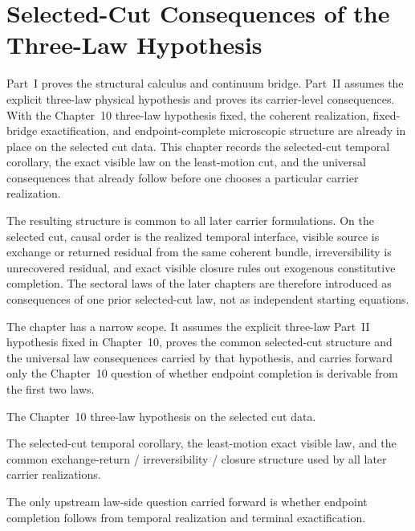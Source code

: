 \section{Selected-Cut Consequences of the Three-Law Hypothesis}
\label{sec:temporal-realization-and-unified-field}

Part~I proves the structural calculus and continuum bridge. Part~II assumes
the explicit three-law physical hypothesis and proves its carrier-level
consequences. With the Chapter~10 three-law hypothesis fixed, the coherent
realization, fixed-bridge exactification, and endpoint-complete microscopic
structure are already in place on the selected cut data. This chapter records
the selected-cut temporal corollary, the exact visible law on the least-motion
cut, and the universal consequences that already follow before one chooses a
particular carrier realization.

The resulting structure is common to all later carrier formulations. On the selected cut,
causal order is the realized temporal interface, visible source is exchange or
returned residual from the same coherent bundle, irreversibility is
unrecovered residual, and exact visible closure rules out exogenous
constitutive completion. The sectoral laws of the later chapters are therefore
introduced as consequences of one prior selected-cut law, not as independent
starting equations.

The chapter has a narrow scope. It assumes the explicit three-law Part~II
hypothesis fixed in Chapter~10, proves the common selected-cut structure and
the universal law consequences carried by that hypothesis, and carries forward only
the Chapter~10 question of whether endpoint completion is derivable from the
first two laws.

\begin{tcolorbox}[colback=white, colframe=black!75, boxrule=0.9pt, title={Chapter 11 at a glance}]
\begin{description}[leftmargin=1.7em, itemsep=0.25em]
\item[Assumes.] The Chapter~10 three-law hypothesis on the selected cut data.
\item[Proves.] The selected-cut temporal corollary, the least-motion exact
      visible law, and the common exchange-return / irreversibility / closure
      structure used by all later carrier realizations.
\item[Open.] The only upstream law-side question carried forward is whether
      endpoint completion follows from temporal realization and terminal
      exactification.
\end{description}
\end{tcolorbox}

